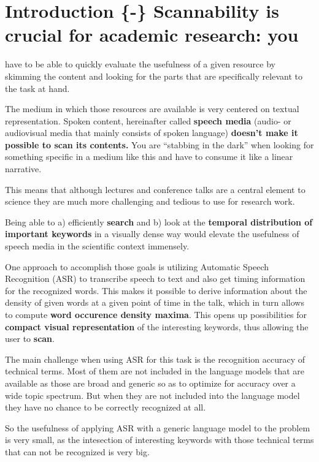 \section{Introduction \{-\} Scannability is crucial for academic
research:
you}\label{introduction---scannability-is-crucial-for-academic-research-you}

have to be able to quickly evaluate the usefulness of a given resource
by skimming the content and looking for the parts that are specifically
relevant to the task at hand.

The medium in which those resources are available is very centered on
textual representation. Spoken content, hereinafter called
\textbf{speech media} (audio- or audiovisual media that mainly consists
of spoken language) \textbf{doesn't make it possible to scan its
contents.} You are ``stabbing in the dark'' when looking for something
specific in a medium like this and have to consume it like a linear
narrative.

This means that although lectures and conference talks are a central
element to science they are much more challenging and tedious to use for
research work.

Being able to a) efficiently \textbf{search} and b) look at the
\textbf{temporal distribution of important keywords} in a visually dense
way would elevate the usefulness of speech media in the scientific
context immensely.

One approach to accomplish those goals is utilizing Automatic Speech
Recognition (ASR) to transcribe speech to text and also get timing
information for the recognized words. This makes it possible to derive
information about the density of given words at a given point of time in
the talk, which in turn allows to compute \textbf{word occurence density
maxima}. This opens up possibilities for \textbf{compact visual
representation} of the interesting keywords, thus allowing the user to
\textbf{scan}.

The main challenge when using ASR for this task is the recognition
accuracy of technical terms. Most of them are not included in the
language models that are available as those are broad and generic so as
to optimize for accuracy over a wide topic spectrum. But when they are
not included into the language model they have no chance to be correctly
recognized at all.

So the usefulness of applying ASR with a generic language model to the
problem is very small, as the intesection of interesting keywords with
those technical terms that can not be recognized is very big.

